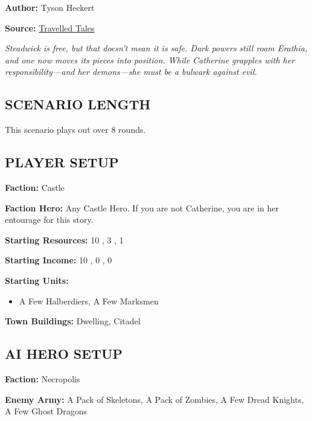 \cleardoublepage{}

\begin{multicols*}{2}

\textbf{Author:} Tyson Heckert

\textbf{Source:} \href{https://travelledtales.com}{Travelled Tales}

\textit{Steadwick is free, but that doesn't mean it is safe.
Dark powers still roam Erathia, and one now moves its pieces into position.
While Catherine grapples with her responsibility—and her demons—she must be a bulwark against evil.}

\subsection*{\MakeUppercase{Scenario length}}

This scenario plays out over 8 rounds.

\subsection*{\MakeUppercase{Player setup}}

\textbf{Faction:} Castle

\textbf{Faction Hero:} Any Castle Hero. If you are not Catherine, you are in her entourage for this story.

\textbf{Starting Resources:} 10 , 3 , 1 

\textbf{Starting Income:} 10 , 0 , 0 

\textbf{Starting Units:}
\begin{itemize}
  \item A Few Halberdiers, A Few Marksmen
\end{itemize}

\textbf{Town Buildings:}  Dwelling, Citadel

\subsection*{\MakeUppercase{AI hero setup}}

\textbf{Faction:} Necropolis

\textbf{Enemy Army:} A Pack of Skeletons, A Pack of Zombies, A Few Dread Knights, A Few Ghost Dragons


\end{multicols*}
